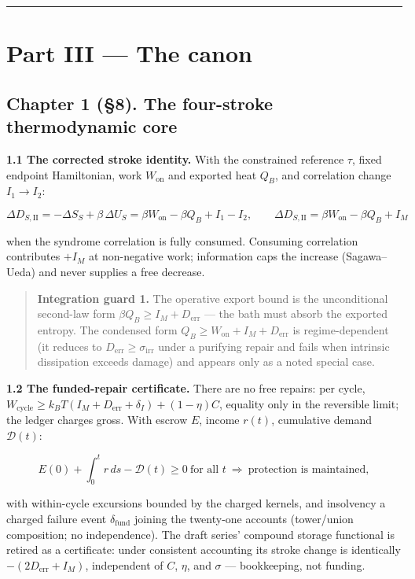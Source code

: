 \documentclass[
]{article}
\begin{document}
\begin{center}\rule{0.5\linewidth}{0.5pt}\end{center}

\section{Part III --- The canon}\label{part-iii-the-canon}

\subsection{Chapter 1 (§8). The four-stroke thermodynamic
core}\label{chapter-1-8.-the-four-stroke-thermodynamic-core}

\textbf{1.1 The corrected stroke identity.} With the constrained
reference \(\tau\), fixed endpoint Hamiltonian, work \(W_{\mathrm{on}}\)
and exported heat \(Q_B\), and correlation change \(I_1\to I_2\):

\[
\Delta D_{S,\mathrm{II}}=-\Delta S_S+\beta\,\Delta U_S=\beta W_{\mathrm{on}}-\beta Q_B+I_1-I_2,
\qquad
\Delta D_{S,\mathrm{II}}=\beta W_{\mathrm{on}}-\beta Q_B+I_M
\]

when the syndrome correlation is fully consumed. Consuming correlation
contributes \textbf{\(+I_M\)} at non-negative work; information caps the
increase (Sagawa--Ueda) and never supplies a free decrease.

\begin{quote}
\textbf{Integration guard 1.} The operative export bound is the
unconditional second-law form
\(\boxed{\beta Q_B\ge I_M+D_{\mathrm{err}}}\) --- the bath must absorb
the exported entropy. The condensed form
\(Q_B\ge W_{\mathrm{on}}+I_M+D_{\mathrm{err}}\) is regime-dependent (it
reduces to \(D_{\mathrm{err}}\ge\sigma_{\mathrm{irr}}\) under a
purifying repair and fails when intrinsic dissipation exceeds damage)
and appears only as a noted special case.
\end{quote}

\textbf{1.2 The funded-repair certificate.} There are no free repairs:
per cycle,
\(W_{\mathrm{cycle}}\ge k_BT(I_M+D_{\mathrm{err}}+\delta_I)+(1-\eta)C\),
equality only in the reversible limit; the ledger charges gross. With
escrow \(E\), income \(r(t)\), cumulative demand \(\mathcal D(t)\):

\[
E(0)+\int_0^t r\,ds-\mathcal D(t)\ge0\ \text{for all }t\ \Longrightarrow\ \text{protection is maintained},
\]

with within-cycle excursions bounded by the charged kernels, and
insolvency a charged failure event \(\delta_{\mathrm{fund}}\) joining
the twenty-one accounts (tower/union composition; no independence). The
draft series' compound storage functional is retired as a certificate:
under consistent accounting its stroke change is identically
\(-(2D_{\mathrm{err}}+I_M)\), independent of \(C\), \(\eta\), and
\(\sigma\) --- bookkeeping, not funding.
\end{document}
